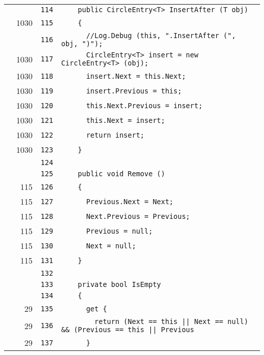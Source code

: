 \documentclass[a4paper,10pt]{article}
\begin{document}
\begin{longtable}[l]{lrrl}
\cellcolor{gray} &  & \verb~114~ & \verb~    public CircleEntry<T> InsertAfter (T obj)~\\
\cellcolor{green} & 1030 & \verb~115~ & \verb~    {~\\
\cellcolor{gray} &  & \verb~116~ & \verb~      //Log.Debug (this, ".InsertAfter (", obj, ")");~\\
\cellcolor{green} & 1030 & \verb~117~ & \verb~      CircleEntry<T> insert = new CircleEntry<T> (obj);~\\
\cellcolor{green} & 1030 & \verb~118~ & \verb~      insert.Next = this.Next;~\\
\cellcolor{green} & 1030 & \verb~119~ & \verb~      insert.Previous = this;~\\
\cellcolor{green} & 1030 & \verb~120~ & \verb~      this.Next.Previous = insert;~\\
\cellcolor{green} & 1030 & \verb~121~ & \verb~      this.Next = insert;~\\
\cellcolor{green} & 1030 & \verb~122~ & \verb~      return insert;~\\
\cellcolor{green} & 1030 & \verb~123~ & \verb~    }~\\
\cellcolor{gray} &  & \verb~124~ & \verb~~\\
\cellcolor{gray} &  & \verb~125~ & \verb~    public void Remove ()~\\
\cellcolor{green} & 115 & \verb~126~ & \verb~    {~\\
\cellcolor{green} & 115 & \verb~127~ & \verb~      Previous.Next = Next;~\\
\cellcolor{green} & 115 & \verb~128~ & \verb~      Next.Previous = Previous;~\\
\cellcolor{green} & 115 & \verb~129~ & \verb~      Previous = null;~\\
\cellcolor{green} & 115 & \verb~130~ & \verb~      Next = null;~\\
\cellcolor{green} & 115 & \verb~131~ & \verb~    }~\\
\cellcolor{gray} &  & \verb~132~ & \verb~~\\
\cellcolor{gray} &  & \verb~133~ & \verb~    private bool IsEmpty~\\
\cellcolor{gray} &  & \verb~134~ & \verb~    {~\\
\cellcolor{green} & 29 & \verb~135~ & \verb~      get {~\\
\cellcolor{green} & 29 & \verb~136~ & \verb~        return (Next == this || Next == null) && (Previous == this || Previous~\\
\cellcolor{green} & 29 & \verb~137~ & \verb~      }~\\

\end{longtable}
\end{document}
